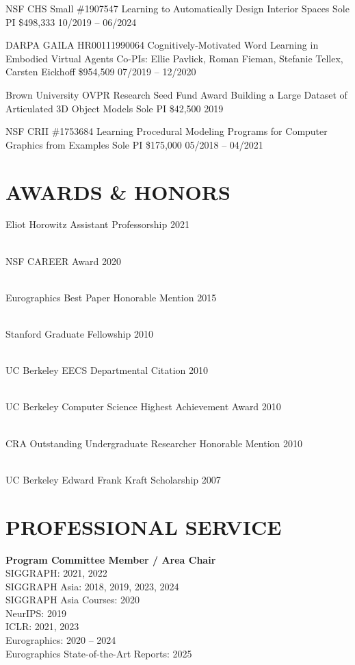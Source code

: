\documentclass[line,margin]{res}
\begin{document}
\begin{resume}
\funding
{NSF CHS Small \#1907547}
{Learning to Automatically Design Interior Spaces}
{Sole PI}
{\$498,333}
{10/2019 -- 06/2024}

\funding
{DARPA GAILA HR00111990064}
{Cognitively-Motivated Word Learning in Embodied Virtual Agents}
{Co-PIs: Ellie Pavlick, Roman Fieman, Stefanie Tellex, Carsten Eickhoff}
{\$954,509}
{07/2019 -- 12/2020}

\funding
{Brown University OVPR Research Seed Fund Award}
{Building a Large Dataset of Articulated 3D Object Models}
{Sole PI}
{\$42,500}
{2019}

\funding
{NSF CRII \#1753684}
{Learning Procedural Modeling Programs for Computer Graphics from Examples}
{Sole PI}
{\$175,000}
{05/2018 -- 04/2021}


\section{AWARDS \& HONORS}

\newcommand{\award}[2] {
	#1 \hfill #2
}

\award
{Eliot Horowitz Assistant Professorship}
{2021}
\\
\award
{NSF CAREER Award}
{2020}
\\
\award
{Eurographics Best Paper Honorable Mention}
{2015}
\\
\award
{Stanford Graduate Fellowship}
{2010}
\\
\award
{UC Berkeley EECS Departmental Citation}
{2010}
\\
\award
{UC Berkeley Computer Science Highest Achievement Award}
{2010}
\\
\award
{CRA Outstanding Undergraduate Researcher Honorable Mention}
{2010}
\\
\award
{UC Berkeley Edward Frank Kraft Scholarship}
{2007}


\section{PROFESSIONAL SERVICE}

\textbf{Program Committee Member / Area Chair}\\
SIGGRAPH: 2021, 2022\\
SIGGRAPH Asia: 2018, 2019, 2023, 2024\\
SIGGRAPH Asia Courses: 2020\\
NeurIPS: 2019\\
ICLR: 2021, 2023\\
Eurographics: 2020 -- 2024\\
Eurographics State-of-the-Art Reports: 2025


\end{resume}
\end{document}
